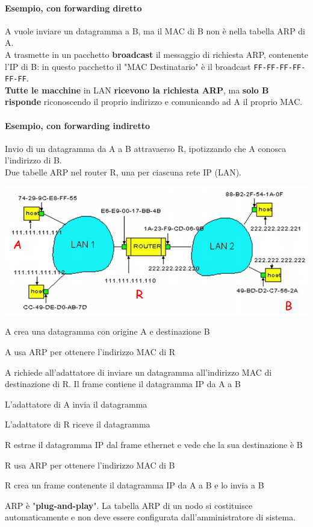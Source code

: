 \documentclass[10pt]{article}
\begin{document}
\paragraph{Esempio, con forwarding diretto} A vuole inviare un datagramma a B, ma il MAC di B non è nella tabella ARP di A.\\
A trasmette in un pacchetto \textbf{broadcast} il messaggio di richiesta ARP, contenente l'IP di B: in questo pacchetto il "MAC Destinatario" è il broadcast \texttt{FF-FF-FF-FF-FF-FF}.\\
\textbf{Tutte le macchine} in LAN \textbf{ricevono la richiesta ARP}, ma \textbf{solo B risponde} riconoscendo il proprio indirizzo e comunicando ad A il proprio MAC.\\
\pagebreak
\paragraph{Esempio, con forwarding indiretto}
Invio di un datagramma da A a B attravaerso R, ipotizzando che A conosca l'indirizzo di B.\\Due tabelle ARP nel router R, una per ciascuna rete IP (LAN).
\begin{center}
	\includegraphics[scale=0.7]{esarpfordiretto.png}
\end{center}
\begin{list}{}{}
	\item A crea una datagramma con origine A e destinazione B
	\item A usa ARP per ottenere l'indirizzo MAC di R
	\item A richiede all'adattatore di inviare un datagramma all'indirizzo MAC di destinazione di R. Il frame contiene il datagramma IP da A a B
	\item L'adattatore di A invia il datagramma
	\item L'adattatore di R riceve il datagramma
	\item R estrae il datagramma IP dal frame ethernet e vede che la sua destinazione è B
	\item R usa ARP per ottenere l'indirizzo MAC di B
	\item R crea un frame contenente il datagramma IP da A a B e lo invia a B
\end{list}
ARP è "\textbf{plug-and-play}". La tabella ARP di un nodo si costituisce automaticamente e non deve essere configurata dall'amministratore di sistema.
\pagebreak
\end{document}
